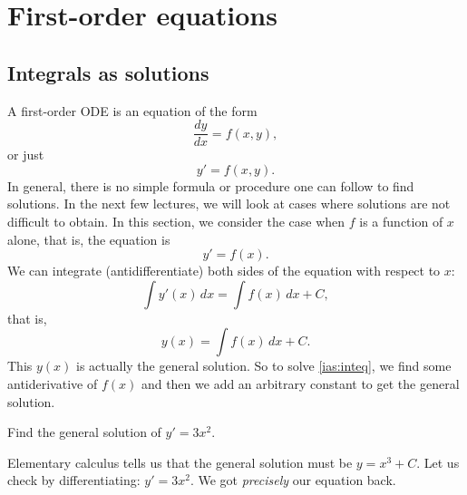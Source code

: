\chapter{First-order equations} \label{fo:chapter}


\section{Integrals as solutions}
\label{integralsols:section}


A first-order ODE is an equation of the form
\begin{equation*}
\frac{dy}{dx} = f(x,y) ,
\end{equation*}
or just
\begin{equation*}
y' = f(x,y) .
\end{equation*}
In general, there is no simple formula or procedure one can follow to find
solutions.
In the next few lectures, we will look at cases where solutions are not
difficult to obtain.
In this section, we consider the case when $f$ is a function of $x$ alone,
that is, the equation is
\begin{equation} \label{ias:inteq}
y' = f(x) .
\end{equation}
We can integrate (antidifferentiate) both sides of the equation with respect to $x$:
\begin{equation*}
\int y'(x) \,dx = \int f(x) \,dx + C ,
\end{equation*}
that is,
\begin{equation*}
y(x) = \int f(x) \,dx + C .
\end{equation*}
This $y(x)$ is actually the general solution.
So to solve \eqref{ias:inteq},
we find some antiderivative of $f(x)$
and then we add an arbitrary constant to get the general solution.

\begin{example}
Find the general solution of $y' = 3 x^2$.

Elementary calculus tells us
that the general solution must be $y = x^3 + C$.  Let us check by
differentiating:
$y' = 3x^2$.  We got \emph{precisely} our equation back.
\end{example}

